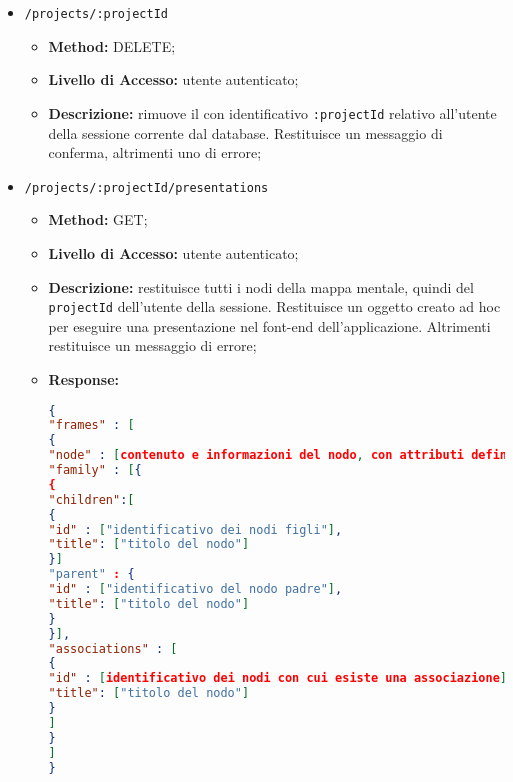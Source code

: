 \begin{itemize}
\begin{itemize}
\item \textbf{Request:}
\begin{lstlisting}[language=json,firstnumber=1]
{
"name" : [nome del progetto],
"bkgColor" : [colore dello sfondo],
"fontColor" : [colore per i testi],
"fontFamily" : [famiglia del font per i testi]
}
\end{lstlisting}
\end{itemize}
\item \texttt{/projects/:projectId}
\begin{itemize}
\item \textbf{Method:} DELETE;
\item \textbf{Livello di Accesso:} utente autenticato;
\item \textbf{Descrizione:} rimuove il  con identificativo \texttt{:projectId} relativo all'utente della sessione corrente dal database. Restituisce un messaggio di conferma, altrimenti uno di errore;
\end{itemize}
\item \texttt{/projects/:projectId/presentations}
\begin{itemize}
\item \textbf{Method:} GET;
\item \textbf{Livello di Accesso:} utente autenticato;
\item \textbf{Descrizione:} restituisce tutti i nodi della mappa mentale, quindi del  \texttt{projectId} dell'utente della sessione. Restituisce un oggetto  creato ad hoc per eseguire una presentazione nel font-end dell'applicazione. Altrimenti restituisce un messaggio di errore;
\item \textbf{Response:}
\begin{lstlisting}[language=json,firstnumber=1]
{
"frames" : [
{
"node" : [contenuto e informazioni del nodo, con attributi definiti nei diagrammi delle classi],
"family" : [{
{
"children":[
{
"id" : ["identificativo dei nodi figli"],
"title": ["titolo del nodo"]
}]
"parent" : {
"id" : ["identificativo del nodo padre"],
"title": ["titolo del nodo"]
}
}],
"associations" : [
{
"id" : [identificativo dei nodi con cui esiste una associazione],
"title": ["titolo del nodo"]
}
]
}
]
}
\end{lstlisting}

\end{itemize}
\end{itemize}
